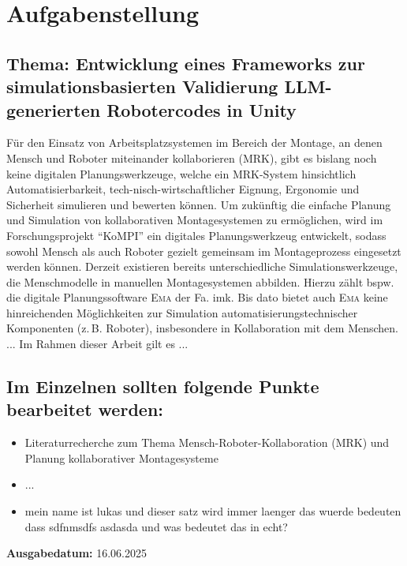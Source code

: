 \chapter*{Aufgabenstellung}
\label{cap:Aufgabenstellung}

\section*{Thema: Entwicklung eines Frameworks zur simulationsbasierten Validierung LLM-generierten Robotercodes in Unity}
\label{sec:Thema: Entwicklung eines Frameworks zur simulationsbasierten Validierung LLM-generierten Robotercodes in Unity}
\noindent
Für den Einsatz von Arbeitsplatzsystemen im Bereich der Montage, an denen Mensch und Roboter miteinander kollaborieren (MRK), gibt es bislang noch keine digitalen Planungswerkzeuge, welche ein MRK-System hinsichtlich Automatisierbarkeit, tech-nisch-wirtschaftlicher Eignung, Ergonomie und Sicherheit simulieren und bewerten können.
Um zukünftig die einfache Planung und Simulation von kollaborativen Montagesystemen zu ermöglichen, wird im Forschungsprojekt "`KoMPI"' ein digitales Planungswerkzeug entwickelt, sodass sowohl Mensch als auch Roboter gezielt gemeinsam im Montageprozess eingesetzt werden können.
Derzeit existieren bereits unterschiedliche Simulationswerkzeuge, die Menschmodelle in manuellen Montagesystemen abbilden.
Hierzu zählt bspw. die digitale Planungssoftware \textsc{Ema} der Fa. imk.
Bis dato bietet auch \textsc{Ema} keine hinreichenden Möglichkeiten zur Simulation automatisierungstechnischer Komponenten (z.\,B. Roboter), insbesondere in Kollaboration mit dem Menschen.
...
Im Rahmen dieser Arbeit gilt es ...

\section*{Im Einzelnen sollten folgende Punkte bearbeitet werden:}
\noindent
\begin{itemize}
	\item Literaturrecherche zum Thema Mensch-Roboter-Kollaboration (MRK) und Planung
	      kollaborativer Montagesysteme
	\item ...
	\item mein name ist lukas und dieser satz wird immer laenger das wuerde bedeuten dass
	      sdfnmsdfs asdasda und was bedeutet das in echt?
\end{itemize}

\noindent
\textbf{Ausgabedatum:} 16.06.2025
